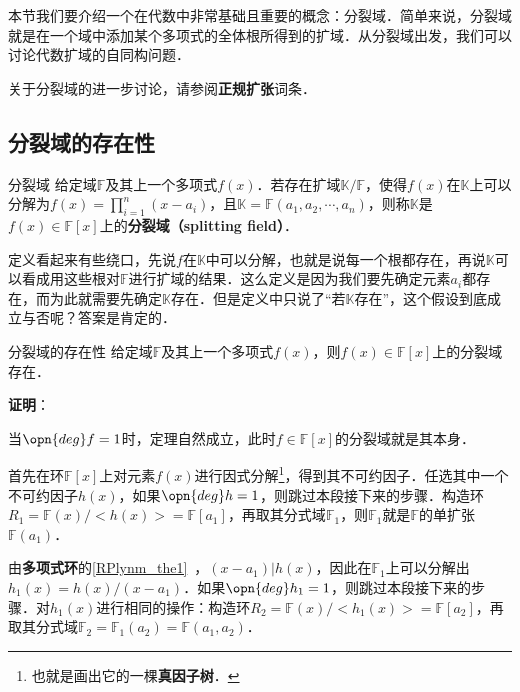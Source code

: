 



本节我们要介绍一个在代数中非常基础且重要的概念：分裂域．简单来说，分裂域就是在一个域中添加某个多项式的全体根所得到的扩域．从分裂域出发，我们可以讨论代数扩域的自同构问题．

关于分裂域的进一步讨论，请参阅\textbf{正规扩张}词条．


\subsection{分裂域的存在性}


\begin{definition}{分裂域}
给定域$\mathbb{F}$及其上一个多项式$f(x)$．若存在扩域$\mathbb{K}/\mathbb{F}$，使得$f(x)$在$\mathbb{K}$上可以分解为$f(x)=\prod_{i=1}^n (x-a_i)$，且$\mathbb{K}=\mathbb{F}(a_1, a_2, \cdots, a_n)$，则称$\mathbb{K}$是$f(x)\in \mathbb{F}[x]$上的\textbf{分裂域（splitting field）}．
\end{definition}

定义看起来有些绕口，先说$f$在$\mathbb{K}$中可以分解，也就是说每一个根都存在，再说$\mathbb{K}$可以看成用这些根对$\mathbb{F}$进行扩域的结果．这么定义是因为我们要先确定元素$a_i$都存在，而为此就需要先确定$\mathbb{K}$存在．但是定义中只说了“若$\mathbb{K}$存在”，这个假设到底成立与否呢？答案是肯定的．

\begin{theorem}{分裂域的存在性}
给定域$\mathbb{F}$及其上一个多项式$f(x)$，则$f(x)\in \mathbb{F}[x]$上的分裂域存在．
\end{theorem}

\textbf{证明}：

当$\opn{deg}f=1$时，定理自然成立，此时$f\in\mathbb{F}[x]$的分裂域就是其本身．

首先在环$\mathbb{F}[x]$上对元素$f(x)$进行因式分解\footnote{也就是画出它的一棵\textbf{真因子树}．}，得到其不可约因子．任选其中一个不可约因子$h(x)$，如果$\opn{deg} h = 1$，则跳过本段接下来的步骤．构造环$R_1=\mathbb{F}(x)/<h(x)>=\mathbb{F}[a_1]$，再取其分式域$\mathbb{F}_1$，则$\mathbb{F}_1$就是$\mathbb{F}$的单扩张$\mathbb{F}(a_1)$．

由\textbf{多项式环}的\autoref{RPlynm_the1}~，$(x-a_1)|h(x)$，因此在$\mathbb{F}_1$上可以分解出$h_1(x)=h(x)/(x-a_1)$．如果$\opn{deg}h_1 = 1$，则跳过本段接下来的步骤．对$h_1(x)$进行相同的操作：构造环$R_2=\mathbb{F}(x)/<h_1(x)>=\mathbb{F}[a_2]$，再取其分式域$\mathbb{F}_2=\mathbb{F}_1(a_2)=\mathbb{F}(a_1, a_2)$．

